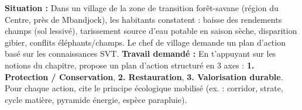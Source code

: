 \documentclass[11pt]{article}
\begin{document}
\begin{exercice}
\textbf{Situation :} Dans un village de la zone de transition forêt-savane (région du Centre, près de Mbandjock), les habitants constatent : baisse des rendements champs (sol lessivé), tarissement source d'eau potable en saison sèche, disparition gibier, conflits éléphants/champs. Le chef de village demande un plan d'action basé sur les connaissances SVT.
\textbf{Travail demandé :} En t'appuyant sur les notions du chapitre, propose un plan d'action structuré en 3 axes : \textbf{1. Protection / Conservation}, \textbf{2. Restauration}, \textbf{3. Valorisation durable}. Pour chaque action, cite le principe écologique mobilisé (ex. : corridor, strate, cycle matière, pyramide énergie, espèce parapluie).
\end{exercice}
\end{document}
